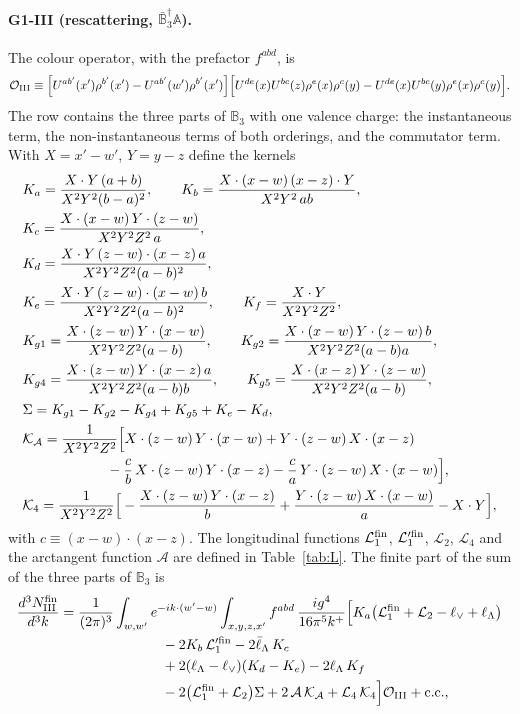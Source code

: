 \documentclass[aps,prd,onecolumn,superscriptaddress,nofootinbib,floatfix,longbibliography,11pt]{revtex4-2}
\numberwithin{equation}{section}
\newcommand{\KK}{\mathcal{K}}
\def\mf#1{\mathbb{#1}}
\newcommand{\lV}{\ell_{\vee}}
\newcommand{\lL}{\ell_{\Lambda}}
\newcommand{\lLb}{\bar\ell_{\Lambda}}
\newcommand{\Lo}{\mathcal{L}_{1}}
\newcommand{\Lop}{\mathcal{L}_{1}'}
\newcommand{\Lt}{\mathcal{L}_{2}}
\newcommand{\Lf}{\mathcal{L}_{4}}
\newcommand{\pre}{\frac{1}{(2\pi)^3}\int_{w,w'}e^{-ik\cdot(w'-w)}}
\newcommand{\Ord}{\mathcal{O}}
\begin{document}
\paragraph*{G1-III (rescattering, $\bar{\mf B}_3^\dagger\mf A$).} The colour operator, with the prefactor $f^{abd}$, is
\begin{equation}
\Ord_{\rm III}\equiv\Big[U^{ab'}(x')\rho^{b'}(x')-U^{ab'}(w')\rho^{b'}(x')\Big]\Big[U^{de}(x)U^{bc}(z)\rho^e(x)\rho^c(y)-U^{de}(x)U^{bc}(y)\rho^e(x)\rho^c(y)\Big].
\end{equation}
The row contains the three parts of $\mf B_3$ with one valence charge: the instantaneous term, the non-instantaneous terms of both orderings, and the commutator term. With $X=x'-w'$, $Y=y-z$ define the kernels
\begin{align}
&K_a=\frac{X\cdot Y\,(a+b)}{X^2Y^2(b-a)^2},\qquad K_b=\frac{X\cdot(x-w)\,(x-z)\cdot Y}{X^2Y^2\,ab},\notag\\
&K_c=\frac{X\cdot(x-w)\,Y\cdot(z-w)}{X^2Y^2Z^2\,a},\notag\\
&K_d=\frac{X\cdot Y\,(z-w)\cdot(x-z)\,a}{X^2Y^2Z^2(a-b)^2},\notag\\
&K_e=\frac{X\cdot Y\,(z-w)\cdot(x-w)\,b}{X^2Y^2Z^2(a-b)^2},\qquad K_f=\frac{X\cdot Y}{X^2Y^2Z^2},\notag\\
&K_{g1}=\frac{X\cdot(z-w)\,Y\cdot(x-w)}{X^2Y^2Z^2(a-b)},\qquad K_{g2}=\frac{X\cdot(x-w)\,Y\cdot(z-w)\,b}{X^2Y^2Z^2(a-b)a},\notag\\
&K_{g4}=\frac{X\cdot(z-w)\,Y\cdot(x-z)\,a}{X^2Y^2Z^2(a-b)b},\qquad K_{g5}=\frac{X\cdot(x-z)\,Y\cdot(z-w)}{X^2Y^2Z^2(a-b)},\notag\\
&\Sigma=K_{g1}-K_{g2}-K_{g4}+K_{g5}+K_e-K_d,\notag\\
&\KK_{\mathcal A}=\frac{1}{X^2Y^2Z^2}\Big[X\cdot(z-w)\,Y\cdot(x-w)+Y\cdot(z-w)\,X\cdot(x-z)\notag\\
&\hspace{6em}-\frac{c}{b}\,X\cdot(z-w)\,Y\cdot(x-z)-\frac{c}{a}\,Y\cdot(z-w)\,X\cdot(x-w)\Big],\notag\\
&\KK_4=\frac{1}{X^2Y^2Z^2}\Big[-\frac{X\cdot(z-w)\,Y\cdot(x-z)}{b}+\frac{Y\cdot(z-w)\,X\cdot(x-w)}{a}-X\cdot Y\Big],
\end{align}
with $c\equiv(x-w)\cdot(x-z)$. The longitudinal functions $\Lo^{\rm fin}$, $\Lop^{\rm fin}$, $\Lt$, $\Lf$ and the arctangent function $\mathcal A$ are defined in Table~\ref{tab:L}. The finite part of the sum of the three parts of $\mf B_3$ is
\begin{align}
\frac{d^3N^{\rm fin}_{\rm III}}{d^3k}={}&\pre\int_{x,y,z,x'}f^{abd}\,\frac{ig^4}{16\pi^5k^+}\Big[K_a\big(\Lo^{\rm fin}+\Lt-\lV+\lL\big)\notag\\
&\hspace{6em}-2K_b\,\Lop^{\rm fin}-2\lLb\,K_c\notag\\
&\hspace{6em}+2(\lL-\lV)(K_d-K_e)-2\lL\,K_f\notag\\
&\hspace{6em}-2\big(\Lo^{\rm fin}+\Lt\big)\Sigma+2\,\mathcal A\,\KK_{\mathcal A}+\Lf\,\KK_4\Big]\Ord_{\rm III}+{\rm c.c.},
\label{eq:finIII}
\end{align}
\end{document}
